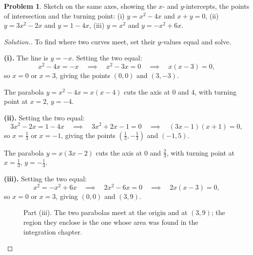 \documentclass[11pt,a4paper]{article}
\theoremstyle{definition}
\newtheorem{problemx}{Problem}[section]
\newenvironment{problem}{\begin{problemx}}{\end{problemx}}
\newenvironment{solution}
  {\renewcommand{\qedsymbol}{}\begin{proof}[\textit{Solution}.]}
  {\end{proof}}
\begin{document}
\begin{problem}
Sketch on the same axes, showing the $x$- and $y$-intercepts, the points of intersection
and the turning point:
\quad (i) $y=x^2-4x$ and $x+y=0$, \quad (ii) $y=3x^2-2x$ and $y=1-4x$, \quad
(iii) $y=x^2$ and $y=-x^2+6x$.
\end{problem}

\begin{solution}
To find where two curves meet, set their $y$-values equal and solve.

\textbf{(i).} The line is $y=-x$. Setting the two equal:
$$x^2-4x=-x\quad\implies\quad x^2-3x=0\quad\implies\quad x(x-3)=0,$$
so $x=0$ or $x=3$, giving the points $(0,0)$ and $(3,-3)$.

The parabola $y=x^2-4x=x(x-4)$ cuts the axis at $0$ and $4$, with turning point at
$x=2$, $y=-4$.

\textbf{(ii).} Setting the two equal:
$$3x^2-2x=1-4x\quad\implies\quad 3x^2+2x-1=0\quad\implies\quad (3x-1)(x+1)=0,$$
so $x=\frac{1}{3}$ or $x=-1$, giving the points $\left(\frac{1}{3},-\frac{1}{3}\right)$
and $(-1,5)$.

The parabola $y=x(3x-2)$ cuts the axis at $0$ and $\frac{2}{3}$, with turning point at
$x=\frac{1}{3}$, $y=-\frac{1}{3}$.

\textbf{(iii).} Setting the two equal:
$$x^2=-x^2+6x\quad\implies\quad 2x^2-6x=0\quad\implies\quad 2x(x-3)=0,$$
so $x=0$ or $x=3$, giving $(0,0)$ and $(3,9)$.

\begin{figure}[H]
\centering
{}
\caption{Part (iii). The two parabolas meet at the origin and at $(3,9)$; the region they enclose is the one whose area was found in the integration chapter.}
\end{figure}


\end{solution}
\end{document}
